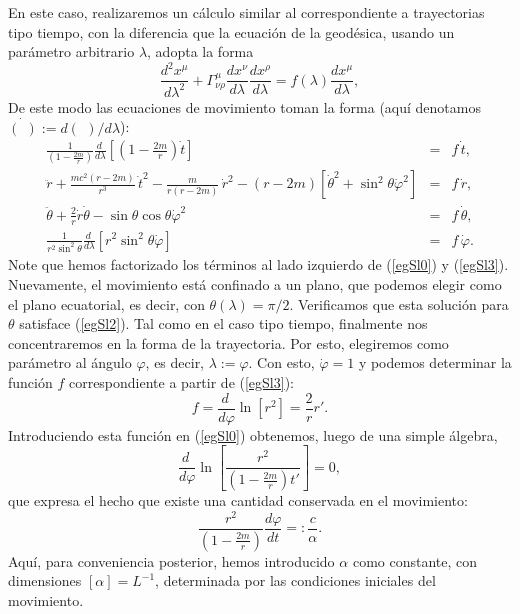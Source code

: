En este caso, realizaremos un cálculo similar al correspondiente a trayectorias tipo tiempo, con la diferencia que la ecuación de la geodésica, usando un parámetro arbitrario $\lambda$, adopta la forma
\begin{equation}
\frac{d^2x^\mu}{d\lambda^2}+\Gamma^\mu_{\nu\rho}\frac{dx^\nu}{d\lambda}\frac{dx^\rho}{d\lambda}=f(\lambda)\frac{dx^\mu}{d\lambda},
\end{equation}
De este modo las ecuaciones de movimiento toman la forma (aquí denotamos $\dot{(\ \,)}:={d(\ \,)}/{d\lambda}$):
\begin{eqnarray}
\frac{1}{\left(1-\frac{2m}{r}\right)}\frac{d\ }{d\lambda}\left[\left(1-\frac{2m}{r}\right)\dot{t}\right]&=&f\,\dot{t}, \label{egSl0}\\
\ddot{r}+\frac{mc^2(r-2m)}{r^3}\,\dot{t}^2-\frac{m}{r\left(
r-2m\right) }\,\dot{r}^2-(r-2m) \left[ \dot{\theta}^2+\sin
^2\theta \dot{\varphi}^2\right] &=&f\,\dot{r}, \label{egSl1}\\
\ddot{\theta}+\frac{2}{r}\dot{r}\dot{\theta}-\sin \theta \cos \theta
\dot{\varphi}^2 &=&f\,\dot{\theta}, \label{egSl2}\\
\frac{1}{r^2\sin^2\theta}\frac{d\ }{d\lambda}\left[r^2\sin^2\theta\dot{\varphi}\right] &=&f\,\dot{\varphi}.\label{egSl3}
\end{eqnarray}%
Note que hemos factorizado los términos al lado izquierdo de (\ref{egSl0}) y (\ref{egSl3}). Nuevamente, el movimiento está confinado a un plano, que podemos elegir como el plano ecuatorial, es decir, con $\theta(\lambda)=\pi/2$. Verificamos que esta solución para $\theta$ satisface (\ref{egSl2}). Tal como en el caso tipo tiempo, finalmente nos concentraremos en la forma de la trayectoria. Por esto, elegiremos como parámetro al ángulo $\varphi$, es decir, $\lambda:=\varphi$. Con esto, $\dot{\varphi}=1$ y podemos determinar la función $f$ correspondiente a partir de (\ref{egSl3}):
\begin{equation}
f=\frac{d\ }{d\varphi}\ln\left[r^2\right]=\frac{2}{r}r'.
\end{equation}
Introduciendo esta función en (\ref{egSl0}) obtenemos, luego de una simple álgebra,
\begin{equation}
\frac{d\ }{d\varphi}\ln\left[\frac{r^2}{\left(1-\frac{2m}{r}\right)t'}\right]=0,
\end{equation}
que expresa el hecho que existe una cantidad conservada en el movimiento:
\begin{equation}\label{ccl}
 \frac{r^2}{\left(1-\frac{2m}{r}\right)}\frac{d\varphi}{dt}=:\frac{c}{\alpha}.
\end{equation}
Aquí, para conveniencia posterior, hemos introducido $\alpha$ como constante, con dimensiones $[\alpha]=L^{-1}$, determinada por las condiciones iniciales del movimiento.

